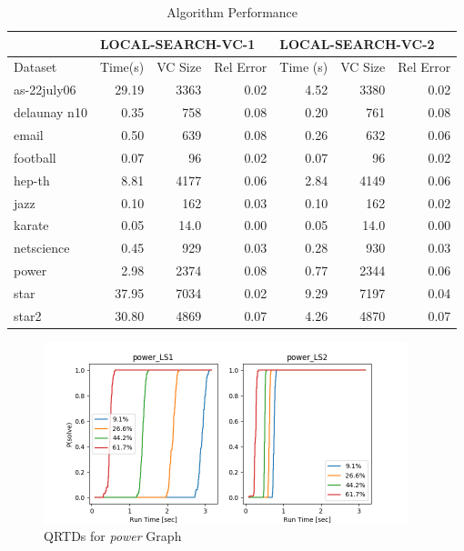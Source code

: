 \documentclass[sigconf]{acmart}
\begin{document}
\begin{table}[h]
	\caption{Algorithm Performance}
	\label{table:algperf}
	\begin{tabular}{lrrrrrr}
		\toprule
		& \multicolumn{3}{l}{LOCAL-SEARCH-VC-1} & \multicolumn{3}{l}{LOCAL-SEARCH-VC-2} \\ \midrule
		Dataset & Time(s)    & VC Size   & Rel Error  & Time (s)   & VC Size   & Rel Error  \\ \midrule
		as-22july06    & 29.19   & 3363      & 0.02   & 4.52   & 3380      & 0.02   \\
		delaunay n10    & 0.35   & 758      & 0.08   & 0.20   & 761      & 0.08   \\
		email    & 0.50   & 639      & 0.08   & 0.26   & 632      & 0.06   \\
		football    & 0.07   & 96      & 0.02   & 0.07   & 96      & 0.02   \\
		hep-th    & 8.81   & 4177      & 0.06   & 2.84   & 4149      & 0.06   \\
		jazz    & 0.10   & 162      & 0.03   & 0.10   & 162      & 0.02   \\
		karate    & 0.05   & 14.0      & 0.00   & 0.05   & 14.0      & 0.00   \\
		netscience    & 0.45   & 929      & 0.03   & 0.28   & 930      & 0.03   \\
		power    & 2.98   & 2374      & 0.08   & 0.77   & 2344      & 0.06   \\
		star    & 37.95   & 7034      & 0.02   & 9.29   & 7197      & 0.04   \\
		star2    & 30.80   & 4869      & 0.07   & 4.26   & 4870      & 0.07   \\
		\bottomrule
	\end{tabular}
\end{table}

\begin{figure}[h]
	\centering
	\includegraphics[width=400px]{plots/qrtd_power.png}
	\caption{QRTDs for \textit{power} Graph}
	\label{figure:qrtd_power}
\end{figure}
\end{document}
